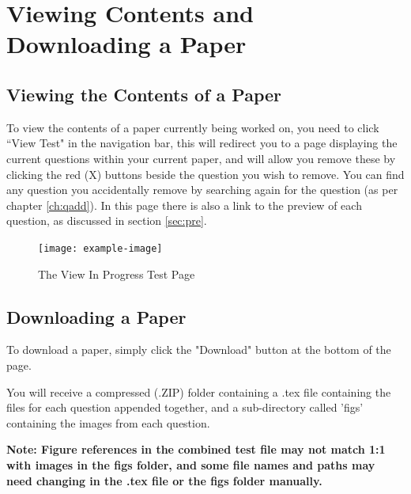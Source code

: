 \documentclass[12pt, a4paper, titlepage]{book}
\begin{document}
\chapter{Viewing Contents and Downloading a Paper}
\section{Viewing the Contents of a Paper}
To view the contents of a paper currently being worked on, you need to click ``View Test" in the navigation bar, this will redirect you to a page displaying the current questions within your current paper, and will allow you remove these by clicking the red (X) buttons beside the question you wish to remove. You can find any question you accidentally remove by searching again for the question (as per chapter \ref{ch:qadd}). In this page there is also a link to the preview of each question, as discussed in section \ref{sec:pre}.\par
\begin{figure}[H]
\centering
\texttt{[image: example-image]}
\caption{The View In Progress Test Page}
\end{figure}

\section{Downloading a Paper}
To download a paper, simply click the "Download" button at the bottom of the page. \par You will receive a compressed (.ZIP) folder containing a .tex file containing the files for each question appended together, and a sub-directory called 'figs' containing the images from each question.
\par \textbf{Note: Figure references in the combined test file may not match 1:1 with images in the figs folder, and some file names and paths may need changing in the .tex file or the figs folder manually.}
\end{document}
